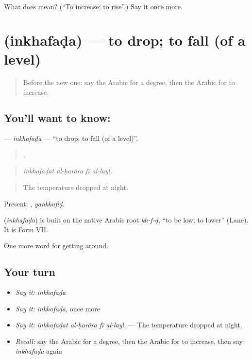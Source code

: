 \begin{tcolorbox}[breakable,colback=teal!4,colframe=teal!35!black,title={Before you move on}]
What does  mean? (\textquotedblleft{}To increase; to rise\textquotedblright{}.) Say it once more.
\end{tcolorbox}
\section[\texorpdfstring{\ar{انخفض} (inkhafaḍa)}{انخفض (inkhafaḍa)}]{ (inkhafaḍa) — to drop; to fall (of a level)}

\label{lesson:AR-C480-inkhafada}



\begin{quote}
Before the new one: say the Arabic for a degree, then the Arabic for to increase.
\end{quote}

\subsection*{You'll want to know: }
\textbf{} — \emph{inkhafaḍa} — \textquotedblleft{}to drop; to fall (of a level)\textquotedblright{}.

\begin{quote}
   .
\end{quote}

\begin{quote}
\emph{inkhafaḍat al-ḥarāra fī al-layl.}
\end{quote}

\begin{quote}
The temperature dropped at night.
\end{quote}

Present: , \emph{yankhafiḍ}.

\begin{cousinweb}
\textbf{} (\emph{inkhafaḍa}) is built on the native Arabic root \emph{kh-f-ḍ}, \textquotedblleft{}to be low; to lower\textquotedblright{} (Lane). It is Form VII.
\end{cousinweb}

\begin{grammarlens}[title={What you've built}]
One more word for getting around.
\end{grammarlens}

\subsection*{Your turn}
\begin{itemize}
\raggedright
  \item \emph{Say it:} \emph{inkhafaḍa}
  \item \emph{Say it:} \emph{inkhafaḍa}, once more
  \item \emph{Say it:} \emph{inkhafaḍat al-ḥarāra fī al-layl.} — The temperature dropped at night.
  \item \emph{Recall:} say the Arabic for a degree, then the Arabic for to increase, then say \emph{inkhafaḍa} again
\end{itemize}

